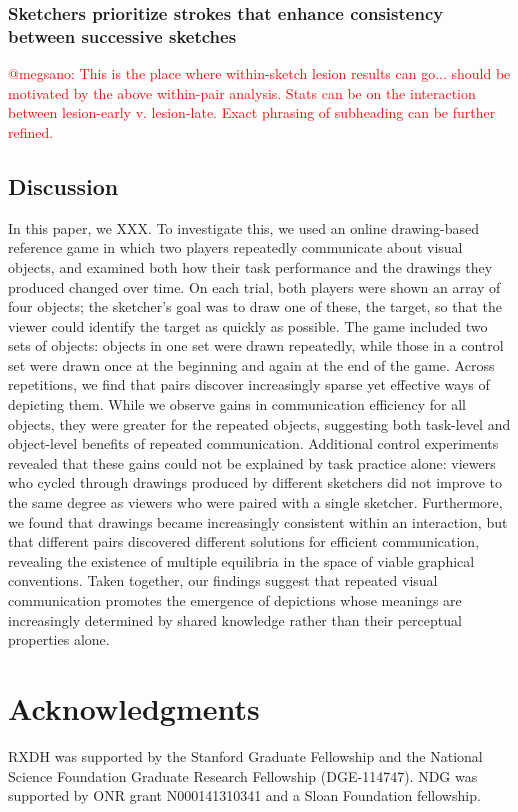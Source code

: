 \documentclass[10pt,letterpaper]{article}
\newcommand{\red}[1]{\textcolor{Red}{#1}}
\begin{document}
\subsubsection{Sketchers prioritize strokes that enhance consistency between successive sketches} 

\red{@megsano: This is the place where within-sketch lesion results can go... should be motivated by the above within-pair analysis. Stats can be on the interaction between lesion-early v. lesion-late. Exact phrasing of subheading can be further refined.}



\subsection{Discussion}

In this paper, we XXX.
To investigate this, we used an online drawing-based reference game in which two players repeatedly communicate about visual objects, and examined both how their task performance and the drawings they produced changed over time. 
On each trial, both players were shown an array of four objects; the sketcher’s goal was to draw one of these, the target, so that the viewer could identify the target as quickly as possible. 
The game included two sets of objects: objects in one set were drawn repeatedly, while those in a control set were drawn once at the beginning and again at the end of the game. 
Across repetitions, we find that pairs discover increasingly sparse yet effective ways of depicting them. 
While we observe gains in communication efficiency for all objects, they were greater for the repeated objects, suggesting both task-level and object-level benefits of repeated communication. 
Additional control experiments revealed that these gains could not be explained by task practice alone: viewers who cycled through drawings produced by different sketchers did not improve to the same degree as viewers who were paired with a single sketcher. 
Furthermore, we found that drawings became increasingly consistent within an interaction, but that different pairs discovered different solutions for efficient communication, revealing the existence of multiple equilibria in the space of viable graphical conventions. 
Taken together, our findings suggest that repeated visual communication promotes the emergence of depictions whose meanings are increasingly determined by shared knowledge rather than their perceptual properties alone.

\section{\bf Acknowledgments}
\small
RXDH was supported by the Stanford Graduate Fellowship and the National Science Foundation Graduate Research Fellowship (DGE-114747). NDG was supported by ONR grant N000141310341 and a Sloan Foundation fellowship.


\setlength{\bibleftmargin}{.125in}
\setlength{\bibindent}{-\bibleftmargin}


\end{document}

